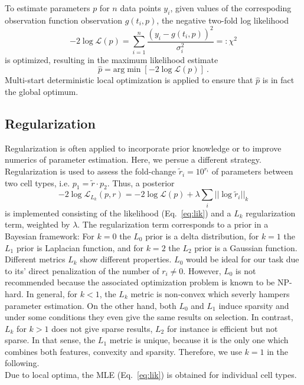 \documentclass{bioinfo}
\begin{document}
To estimate parameters $p$ for $n$ data points ${y_i}$, given values of the correspoding observation function observation $g(t_i,p)$, the negative two-fold log likelihood
\begin{equation}
-2\log \mathcal L(p) = \sum_{i=1}^n \frac{(y_i-g(t_i,p))^2}{\sigma_i^2} =: \chi^2\label{eq:lik}
\end{equation}
is optimized, resulting in the maximum likelihood estimate
\begin{equation}
\hat p = \text{arg}\min \left[ -2\log \mathcal L(p) \right] \:.
\end{equation}
Multi-start deterministic local optimization is applied to ensure that $\hat p$ is in fact the global optimum.

\subsection{Regularization}
Regularization is often applied to incorporate prior knowledge or to improve numerics of parameter estimation.
Here, we persue a different strategy.
Regularization is used to assess the fold-change $\tilde r_i = 10^{r_i}$ of parameters between two cell types, i.e. $p_1 = \tilde r \cdot p_2$.
Thus, a posterior
\begin{equation}
-2\log \mathcal L_{L_k}(p,r) = -2\log \mathcal L(p) + \lambda \sum_i ||\log \tilde r_i||_k\label{eq:likreg}%
\end{equation}
is implemented consisting of the likelihood (Eq.~\ref{eq:lik}) and a $L_k$ regularization term, weighted by $\lambda$.
The regularization term corresponds to a prior in a Bayesian framework:
For $k=0$ the $L_0$ prior is a delta distribution, for $k=1$ the $L_1$ prior is Laplacian function, and for $k=2$ the $L_2$ prior is a Gaussian function.\\
Different metrics $L_k$ show different properties.
$L_0$ would be ideal for our task due to its' direct penalization of the number of $r_i \neq 0$.
However, $L_0$ is not recommended because the associated optimization problem is known to be NP-hard.
In general, for $k<1$, the $L_k$ metric is non-convex which severly hampers parameter estimation.
On the other hand, both $L_0$ and $L_1$ induce sparsity and under some conditions they even give the same results on selection.
In contrast, $L_k$ for $k>1$ does not give sparse results, $L_2$ for instance is efficient but not sparse.
In that sense, the $L_1$ metric is unique, because it is the only one which combines both features, convexity and sparsity.
Therefore, we use $k=1$ in the following.\\
Due to local optima, the MLE (Eq.~\ref{eq:lik}) is obtained for individual cell types.
\end{document}
